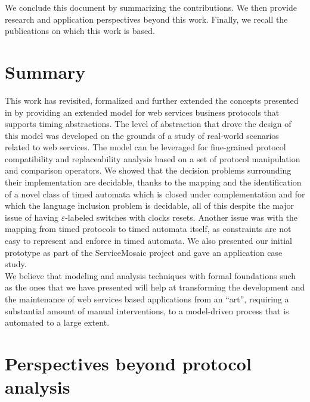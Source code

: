 
We conclude this document by summarizing the contributions. We then provide research and application perspectives beyond this work. Finally, we recall the publications on which this work is based.


\section{Summary}


This work has revisited, formalized and further extended the concepts presented in \cite{FTBB,BBFC04,BCT-CAISE03,KBBB+04} by providing an extended model for web services business protocols that supports timing abstractions. The level of abstraction that drove the design of this model was developed on the grounds of a study of real-world scenarios related to web services. The model can be leveraged for fine-grained protocol compatibility and replaceability analysis based on a set of protocol manipulation and comparison operators. We showed that the decision problems surrounding their implementation are decidable, thanks to the mapping and the identification of a novel class of timed automata which is closed under complementation and for which the language inclusion problem is decidable, all of this despite the major issue of having $\varepsilon$-labeled switches with clocks resets. Another issue was with the mapping from timed protocols to timed automata itself, as \MInvoke constraints are not easy to represent and enforce in timed automata. We also presented our initial prototype as part of the ServiceMosaic project and gave an application case study.\\

We believe that modeling and analysis techniques with formal foundations such as the ones that we have presented will help at transforming the development and the maintenance of web services based applications from an ``art'', requiring a substantial amount of manual interventions, to a model-driven process that is automated to a large extent.


\section{Perspectives beyond protocol analysis}

